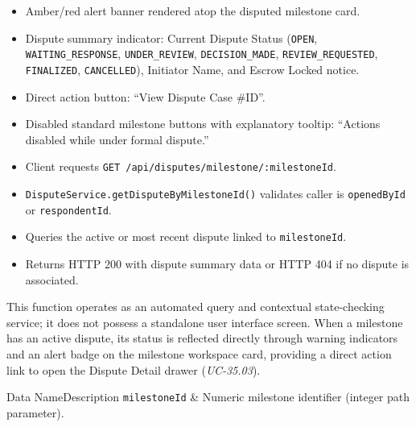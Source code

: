 \begin{itemize}[leftmargin=1.6em,topsep=3pt,itemsep=2pt,parsep=0pt,label=$\bullet$]
      \item Amber/red alert banner rendered atop the disputed milestone card.
      \item Dispute summary indicator: Current Dispute Status (\texttt{OPEN}, \texttt{WAITING\_RESPONSE}, \texttt{UNDER\_REVIEW}, \texttt{DECISION\_MADE}, \texttt{REVIEW\_REQUESTED}, \texttt{FINALIZED}, \texttt{CANCELLED}), Initiator Name, and Escrow Locked notice.
      \item Direct action button: ``View Dispute Case \#ID''.
      \item Disabled standard milestone buttons with explanatory tooltip: ``Actions disabled while under formal dispute.''
\end{itemize}

\begin{itemize}[leftmargin=1.6em,topsep=3pt,itemsep=2pt,parsep=0pt,label=$\bullet$]
      \item Client requests \texttt{GET /\allowbreak{}api/\allowbreak{}disputes/\allowbreak{}milestone/\allowbreak{}:\allowbreak{}milestoneId}.
      \item \texttt{DisputeService.\allowbreak{}getDisputeByMilestoneId()} validates caller is \texttt{openedById} or \texttt{respondentId}.
      \item Queries the active or most recent dispute linked to \texttt{milestoneId}.
      \item Returns HTTP 200 with dispute summary data or HTTP 404 if no dispute is associated.
\end{itemize}

\noindent This function operates as an automated query and contextual state-checking service; it does not possess a standalone user interface screen. When a milestone has an active dispute, its status is reflected directly through warning indicators and an alert badge on the milestone workspace card, providing a direct action link to open the Dispute Detail drawer (\textit{UC-35.03}).


\begin{specdatatable}{Data Name}{Description}
      \texttt{milestoneId} & Numeric milestone identifier (integer path parameter).\\ \hline
\end{specdatatable}

